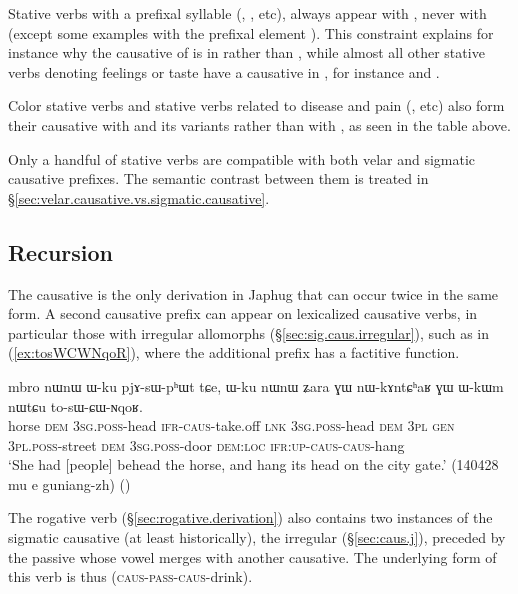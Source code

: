 Stative verbs with a prefixal syllable (, ,  etc), always appear with , never with  (except some examples with the prefixal element ). This constraint explains for instance why the causative of  is  in  rather than , while almost all other stative verbs denoting feelings or taste have a causative in , for instance  \fl{}  and  \fl{} .
  
Color stative verbs and stative verbs related to disease and pain (,  etc) also form their causative with  and its variants rather than with , as seen in the table above.
  
Only a handful of  stative verbs are compatible with both velar and sigmatic causative prefixes. The semantic contrast between them is treated in §\ref{sec:velar.causative.vs.sigmatic.causative}.
    
\subsection{Recursion} \label{sec:sig.caus.other.recursion}
The causative is the only derivation in Japhug that can occur twice in the same form. A second causative prefix can appear on lexicalized causative verbs, in particular those with irregular allomorphs (§\ref{sec:sig.caus.irregular}), such as  in (\ref{ex:tosWCWNqoR}), where the additional  prefix has a factitive function. 

\begin{exe}
\ex \label{ex:tosWCWNqoR}
\gll mbro nɯnɯ ɯ-ku pjɤ-sɯ-pʰɯt tɕe, ɯ-ku nɯnɯ ʑara ɣɯ nɯ-kɤntɕʰaʁ ɣɯ ɯ-kɯm nɯtɕu to-sɯ-ɕɯ-ɴqoʁ. \\
horse \textsc{dem} \textsc{3sg}.\textsc{poss}-head \textsc{ifr}-\textsc{caus}-take.off \textsc{lnk} \textsc{3sg}.\textsc{poss}-head \textsc{dem} \textsc{3pl} \textsc{gen} \textsc{3pl}.\textsc{poss}-street \textsc{dem} \textsc{3sg}.\textsc{poss}-door \textsc{dem}:\textsc{loc} \textsc{ifr}:\textsc{up}-\textsc{caus}-\textsc{caus}-hang \\
\glt `She had [people] behead the horse, and hang its head on the city gate.' (140428 mu e guniang-zh)
()
  \end{exe} 
  
The rogative verb   (§\ref{sec:rogative.derivation}) also contains two instances of the sigmatic causative (at least historically), the irregular  (§\ref{sec:caus.j}), preceded by the passive  whose vowel merges with another causative. The underlying form of this verb is thus  (\textsc{caus}-\textsc{pass}-\textsc{caus}-drink).

